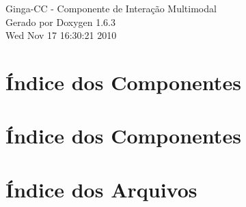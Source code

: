 \documentclass[a4paper]{book}
\begin{document}
\begin{titlepage}
\vspace*{7cm}
\begin{center}
{\Large Ginga-\/CC -\/ Componente de Interação Multimodal }\\
\vspace*{1cm}
{\large Gerado por Doxygen 1.6.3}\\
\vspace*{0.5cm}
{\small Wed Nov 17 16:30:21 2010}\\
\end{center}
\end{titlepage}
\clearemptydoublepage
{}
\tableofcontents
\clearemptydoublepage
{}
\chapter{Índice dos Componentes}

\chapter{Índice dos Componentes}

\chapter{Índice dos Arquivos}

\end{document}
